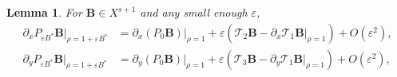 \documentclass[12pt,reqno]{amsart}
\numberwithin{equation}{section}
\newtheorem{lemma}[theorem]{Lemma}
\theoremstyle{definition}
\theoremstyle{remark}
\begin{document}
\begin{lemma}\label{lemma:expan of px-PB}
	For $ \textbf{B} \in X^{s+1} $ and any small enough $\varepsilon$,	
\begin{align*}
\partial_xP_{\varepsilon B^*}  \textbf{B}\big|_{\rho=1+\varepsilon B^*}
&=\partial_x(P_0  \textbf{B})\big|_{\rho=1}
+\varepsilon\left(\mathcal{T}_2  \textbf{B}-\partial_x  \mathcal{T}_1  \textbf{B}\big|_{\rho=1}\right)+O(\varepsilon^2), \\
\partial_yP_{\varepsilon B^*}  \textbf{B}\big|_{\rho=1+\varepsilon B^*}
&=\partial_y(P_0  \textbf{B})\big|_{\rho=1}
+\varepsilon\left(\mathcal{T}_3  \textbf{B}-\partial_y  \mathcal{T}_1  \textbf{B}\big|_{\rho=1}\right)+O(\varepsilon^2),
\end{align*}
 

\end{lemma}
\end{document}
